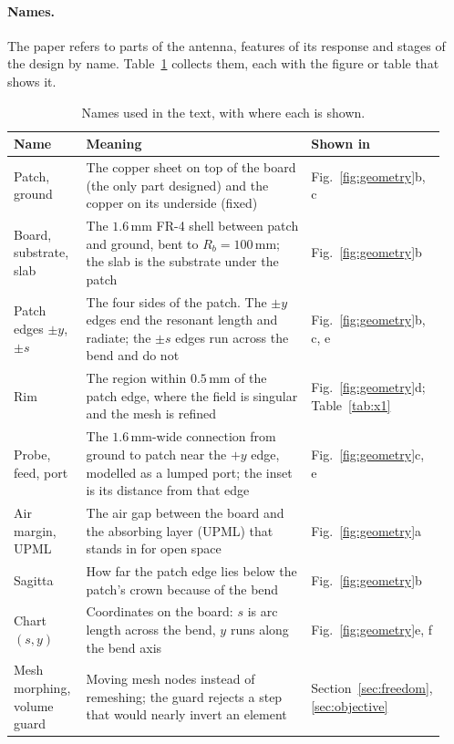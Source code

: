 \documentclass{anvil-paper}
\begin{document}
\paragraph{Names.}
The paper refers to parts of the antenna, features of its response and
stages of the design by name. Table~\ref{tab:terms} collects them, each with
the figure or table that shows it.

\begin{table}[t]
  \centering
  \caption{Names used in the text, with where each is shown.}
  \label{tab:terms}
  \footnotesize
  \begin{tabular}{@{}>{\raggedright\arraybackslash}p{0.17\linewidth}>{\raggedright\arraybackslash}p{0.62\linewidth}>{\raggedright\arraybackslash}p{0.15\linewidth}@{}}
    \toprule
    Name & Meaning & Shown in \\
    \midrule
    Patch, ground & The copper sheet on top of the board (the only part designed) and the copper on its underside (fixed) & Fig.~\ref{fig:geometry}b, c \\
    Board, substrate, slab & The $1.6$\,mm FR-4 shell between patch and ground, bent to $R_b = 100$\,mm; the slab is the substrate under the patch & Fig.~\ref{fig:geometry}b \\
    Patch edges $\pm y$, $\pm s$ & The four sides of the patch. The $\pm y$ edges end the resonant length and radiate; the $\pm s$ edges run across the bend and do not & Fig.~\ref{fig:geometry}b, c, e \\
    Rim & The region within $0.5$\,mm of the patch edge, where the field is singular and the mesh is refined & Fig.~\ref{fig:geometry}d; Table~\ref{tab:x1} \\
    Probe, feed, port & The $1.6$\,mm-wide connection from ground to patch near the $+y$ edge, modelled as a lumped port; the inset is its distance from that edge & Fig.~\ref{fig:geometry}c, e \\
    Air margin, UPML & The air gap between the board and the absorbing layer (UPML) that stands in for open space & Fig.~\ref{fig:geometry}a \\
    Sagitta & How far the patch edge lies below the patch's crown because of the bend & Fig.~\ref{fig:geometry}b \\
    Chart $(s, y)$ & Coordinates on the board: $s$ is arc length across the bend, $y$ runs along the bend axis & Fig.~\ref{fig:geometry}e, f \\
    Mesh morphing, volume guard & Moving mesh nodes instead of remeshing; the guard rejects a step that would nearly invert an element & Section~\ref{sec:freedom}, \ref{sec:objective} \\

\end{tabular}
\end{table}
\end{document}
